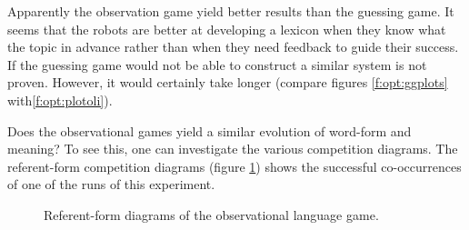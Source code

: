 Apparently the observation game yield better results than the guessing game. It seems that the robots are better at developing a lexicon when they know what the topic in advance rather than when they need feedback to guide their success. If the guessing game would not be able to construct a similar system is not proven. However, it would certainly take longer (compare figures  \ref{f:opt:ggplots} with\ref{f:opt:plotoli}).

Does the observational games yield a similar evolution of word-form and meaning? To see this, one can investigate the various competition diagrams. The referent-form competition diagrams (figure \ref{f:opt:rfoli}) shows the successful co-occurrences of one of the runs of this experiment. 

\begin{figure}[t]
\centering
{}
\caption{Referent-form diagrams of the observational language game.}
\label{f:opt:rfoli}
\end{figure}

